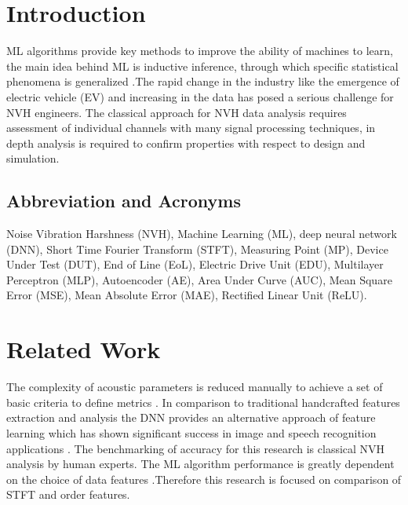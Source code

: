 \documentclass[conference]{IEEEtran}
\begin{document}
\section{Introduction}
ML algorithms provide key methods to improve the ability of machines to learn, the main idea behind ML is inductive inference, through which specific statistical phenomena is generalized \cite{b4}.The rapid change in the industry like the emergence of electric vehicle (EV) and increasing in the data has posed a serious challenge for NVH engineers. The classical approach for NVH data analysis requires assessment of individual channels with many signal processing techniques, in depth analysis is required to confirm properties with respect to design and simulation.
\subsection{Abbreviation and Acronyms}\label{AA}
Noise Vibration Harshness (NVH), Machine Learning (ML), deep neural network (DNN), Short Time Fourier Transform (STFT), Measuring Point (MP), Device Under Test (DUT), End of Line (EoL), Electric Drive Unit (EDU), Multilayer Perceptron (MLP), Autoencoder (AE), Area Under Curve (AUC), Mean Square Error (MSE), Mean Absolute Error (MAE), Rectified Linear Unit (ReLU). 

\section{Related Work}
The complexity of acoustic parameters is reduced manually to achieve a set of basic criteria to define metrics \cite{b3}. In comparison to traditional handcrafted features extraction and analysis the DNN provides an alternative approach of feature learning which has shown significant success in image and speech recognition applications \cite{b1}. The benchmarking of accuracy for this research is classical NVH analysis by human experts. The ML algorithm performance is greatly dependent on the choice of data features \cite{b1}.Therefore this research is focused on comparison of STFT and order features.    
\end{document}
